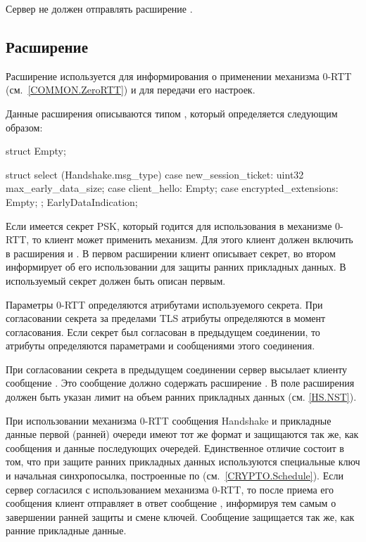 Сервер не должен отправлять расширение .

\subsection{Расширение }\label{HS.Ext.ed} 

Расширение  используется для информирования о применении 
механизма 0-RTT (см.~\ref{COMMON.ZeroRTT}) и для передачи его настроек.

Данные расширения  описываются типом 
, который определяется следующим образом: 

\begin{codeblock}
struct {} Empty;

struct {
  select (Handshake.msg_type) {
    case new_session_ticket:
      uint32 max_early_data_size;
    case client_hello: Empty;
    case encrypted_extensions: Empty;
  };
} EarlyDataIndication;
\end{codeblock}

Если имеется секрет PSK, который годится для использования 
в механизме 0-RTT, то клиент может применить механизм.
%
Для этого клиент должен включить в  расширения 
 и . В первом расширении 
клиент описывает секрет, во втором информирует об его использовании для 
защиты ранних прикладных данных. 
%
В  используемый секрет должен быть описан 
первым.

Параметры 0-RTT определяются атрибутами используемого секрета. 
%
При согласовании секрета за пределами TLS атрибуты определяются в момент 
согласования.
%
Если секрет был согласован в предыдущем соединении, то атрибуты определяются 
параметрами и сообщениями этого соединения.

При согласовании секрета в предыдущем соединении сервер высылает клиенту 
сообщение . Это сообщение должно  
содержать расширение . В поле 
 расширения должен быть  
указан лимит на объем ранних прикладных данных (см. \ref{HS.NST}).

При использовании механизма 0-RTT сообщения Handshake и прикладные данные 
первой (ранней) очереди имеют тот же формат и защищаются так же, как сообщения 
и данные последующих очередей.
%
Единственное отличие состоит в том, что при защите ранних прикладных данных 
используются специальные ключ и начальная синхропосылка, построенные
по  (см.~\ref{CRYPTO.Schedule}).
%
Если сервер согласился с использованием механизма 0-RTT, то после приема его 
сообщения  клиент отправляет в ответ сообщение
, информируя тем самым о завершении ранней 
защиты и смене ключей. Сообщение  защищается так 
же, как ранние прикладные данные.

